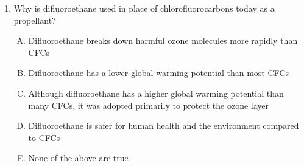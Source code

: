 \documentclass[english,twoside]{article}
\begin{document}
\begin{enumerate}
\begin{enumerate}[A.]
		\item Greenhouse gases absorb and re-emit IR waves that enter the atmosphere from the sun
		\item Greenhouse gases absorb and re-emit IR waves that are radiated from Earth's surfaces
		\item None of the above are true
	\end{enumerate}
	\item Why is difluoroethane used in place of chlorofluorocarbons today as a propellant?
	\begin{enumerate}[A.]
		\item Difluoroethane breaks down harmful ozone molecules more rapidly than CFCs
		\item Difluoroethane has a lower global warming potential than most CFCs
		\item Although difluoroethane has a higher global warming potential than many CFCs, it was adopted primarily to protect the ozone layer
		\item Difluoroethane is safer for human health and the environment compared to CFCs
		\item None of the above are true
	\end{enumerate}
\end{enumerate}
\end{document}

